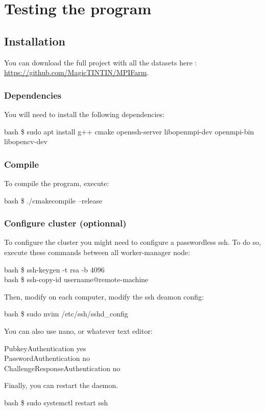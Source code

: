 \section{Testing the program}
\subsection{Installation}
You can download the full project with all the datasets here : \url{https://github.com/MagicTINTIN/MPIFarm}.
\subsubsection{Dependencies}
You will need to install the following dependencies:
\begin{resultbox}
    bash \$ sudo apt install g++ cmake openssh-server libopenmpi-dev openmpi-bin libopencv-dev
\end{resultbox}

\subsubsection{Compile}
To compile the program, execute:
\begin{resultbox}
    bash \$ ./cmakecompile --release
\end{resultbox}

\subsubsection{Configure cluster (optionnal)}
To configure the cluster you might need to configure a passwordless ssh. To do so, execute these commands between all worker-manager node:
\begin{resultbox}
    bash \$ ssh-keygen -t rsa -b 4096\\
    bash \$ ssh-copy-id username@remote-machine
\end{resultbox}
Then, modify on each computer, modify the ssh deamon config:
\begin{resultbox}
    bash \$ sudo nvim /etc/ssh/sshd\_config
\end{resultbox}
You can also use nano, or whatever text editor:
\begin{resultbox}
PubkeyAuthentication yes\\
PasswordAuthentication no\\
ChallengeResponseAuthentication no
\end{resultbox}
Finally, you can restart the daemon.
\begin{resultbox}
    bash \$ sudo systemctl restart ssh
\end{resultbox}
